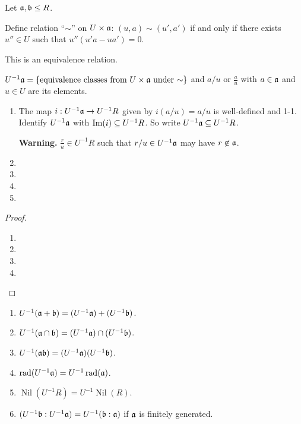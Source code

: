 \noindent Let $\mathfrak{a},\mathfrak{b} \leq R$.

\begin{definition}
    Define relation ``$\sim$'' on $U \times \mathfrak{a}$: $(u,a) \sim (u',a')$ if and only if there exists $u'' \in U$ such that $u''(u'a - ua') = 0$.
\end{definition}

\begin{fact}
    This is an equivalence relation.
\end{fact}

\begin{notation}
    $U^{-1}\mathfrak{a} = \{\text{equivalence classes from $U \times \mathfrak{a}$ under $\sim$}\}$ and $a/u$ or $\frac{a}{u}$ with $a \in \mathfrak{a}$ and $u \in U$ are its elements.
\end{notation}

\begin{proposition}
    \begin{enumerate}
        \item The map $i: U^{-1}\mathfrak{a} \to U^{-1}R$ given by $i(a/u) = a/u$ is well-defined and 1-1. Identify $U^{-1}\mathfrak{a}$ with $\operatorname{Im}(i) \subseteq U^{-1}R$. So write $U^{-1}\mathfrak{a} \subseteq U^{-1}R$. \par 
            \textbf{Warning.} $\frac{r}{u} \in U^{-1}R$ such that $r/u \in U^{-1}\mathfrak{a}$ may have $r \not \in \mathfrak{a}$.
        \item 
        \item 
        \item 
        \item 
    \end{enumerate}
\end{proposition}

\begin{proof}
    \begin{enumerate}
        \item 
        \item 
        \item 
        \item 
    \end{enumerate}
\end{proof}

\begin{proposition}
    \begin{enumerate}
        \item $U^{-1}(\mathfrak{a} + \mathfrak{b}) = (U^{-1}\mathfrak{a}) + (U^{-1}\mathfrak{b})$.
        \item $U^{-1}(\mathfrak{a} \cap \mathfrak{b}) = (U^{-1}\mathfrak{a}) \cap (U^{-1}\mathfrak{b})$.
        \item $U^{-1}(\mathfrak{a} \mathfrak{b}) = (U^{-1}\mathfrak{a}) (U^{-1}\mathfrak{b})$.
        \item $\operatorname{rad}(U^{-1}\mathfrak{a}) = U^{-1} \operatorname{rad}(\mathfrak{a})$.
        \item $\operatorname{Nil}(U^{-1}R) = U^{-1}\operatorname{Nil}(R)$.
        \item $(U^{-1}\mathfrak{b}:U^{-1}\mathfrak{a}) = U^{-1}(\mathfrak{b}:\mathfrak{a})$ if $\mathfrak{a}$ is finitely generated.
    \end{enumerate}
\end{proposition}

